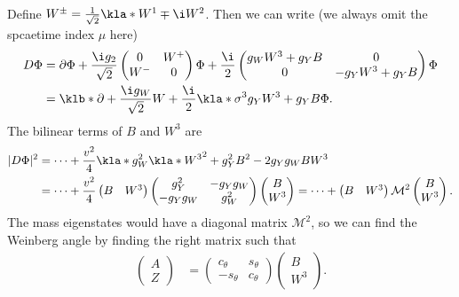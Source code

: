 \documentclass[english, parskip=full]{scrbook}
\newcommand{\example}[3]{\begin{tcolorbox}[colback=colorbackgroundexample,colframe=colorexample, breakable,enhanced,title={\textbf{#1}: #2.}]#3\end{tcolorbox}}
\begin{document}
\example{Higgs Gauge Fields}{Bilinear terms}{
Define $W^\pm = \frac{1}{\sqrt{2}} \kla*{W^1 \mp \i W^2}$.
Then we can write (we always omit the spcaetime index $\mu$ here)
\begin{align}
D\Phi &= \partial\Phi + \frac{\i g_2}{\sqrt{2}} \begin{pmatrix}
0 & W^+ \\ W^- & 0
\end{pmatrix}\Phi + \frac{\i}{2} \begin{pmatrix}
g_W W^3 + g_Y B & 0 \\ 0 & -g_Y W^3 + g_Y B
\end{pmatrix}\Phi \\
&= \klb*{\partial + \frac{\i g_W}{\sqrt{2}} W + \frac{\i}{2} \kla*{\sigma^3 g_Y W^3 + g_YB}}\Phi.
\end{align}
The bilinear terms of $B$ and $W^3$ are
\begin{align}
|D\Phi|^2 &= \dots + \frac{v^2}{4} \kla*{g_W^2 \kla*{W^3}^2 + g_Y^2B^2 - 2g_Yg_W BW^3} \\
&= \dots + \frac{v^2}{4}\begin{pmatrix}
B & W^3
\end{pmatrix} \begin{pmatrix}
g_Y^2 & -g_Yg_W \\ -g_Yg_W & g_W^2
\end{pmatrix} \begin{pmatrix}
B \\ W^3
\end{pmatrix} = \dots + \begin{pmatrix}
B & W^3
\end{pmatrix} \mathcal{M}^2 \begin{pmatrix}
B \\ W^3
\end{pmatrix}.
\end{align}
The mass eigenstates would have a diagonal matrix $\mathcal{M}^2$, so we can find the Weinberg angle by finding the right matrix such that
\begin{align}
\begin{pmatrix}
A \\ Z
\end{pmatrix} &= \begin{pmatrix}
c_\theta & s_\theta \\ -s_\theta & c_\theta
\end{pmatrix} \begin{pmatrix}
B \\ W^3
\end{pmatrix}.

\end{align}}
\end{document}
